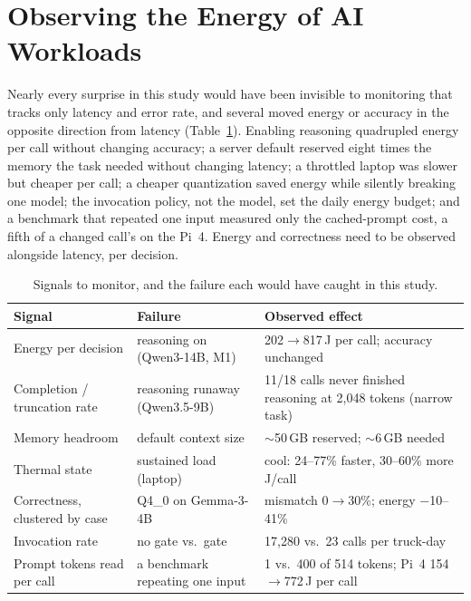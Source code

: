 \documentclass[conference]{IEEEtran}
\begin{document}
\section{Observing the Energy of AI Workloads}
\label{sec:observe}

Nearly every surprise in this study would have been invisible to monitoring that tracks only latency and error rate, and several moved energy or accuracy in the opposite direction from latency (Table~\ref{tab:signals}). Enabling reasoning quadrupled energy per call without changing accuracy; a server default reserved eight times the memory the task needed without changing latency; a throttled laptop was slower but cheaper per call; a cheaper quantization saved energy while silently breaking one model; the invocation policy, not the model, set the daily energy budget; and a benchmark that repeated one input measured only the cached-prompt cost, a fifth of a changed call's on the Pi~4. Energy and correctness need to be observed alongside latency, per decision.

\begin{table}[t]
\caption{Signals to monitor, and the failure each would have caught in this study.}
\label{tab:signals}
\centering
\footnotesize
\setlength{\tabcolsep}{3pt}
\begin{tabular}{@{}p{}p{}p{}@{}}
\toprule
Signal & Failure & Observed effect \\
\midrule
Energy per decision & reasoning on (Qwen3-14B, M1) & 202$\to$817\,J per call; accuracy unchanged \\
Completion / truncation rate & reasoning runaway (Qwen3.5-9B) & 11/18 calls never finished reasoning at 2,048 tokens (narrow task) \\
Memory headroom & default context size & $\sim$50\,GB reserved; $\sim$6\,GB needed \\
Thermal state & sustained load (laptop) & cool: 24--77\% faster, 30--60\% more J/call \\
Correctness, clustered by case & Q4\_0 on Gemma-3-4B & mismatch 0$\to$30\%; energy $-$10--41\% \\
Invocation rate & no gate vs.\ gate & 17,280 vs.\ 23 calls per truck-day \\
Prompt tokens read per call & a benchmark repeating one input & 1 vs.\ 400 of 514 tokens; Pi~4 154$\to$772\,J per call \\
\bottomrule
\end{tabular}
\end{table}
\end{document}
